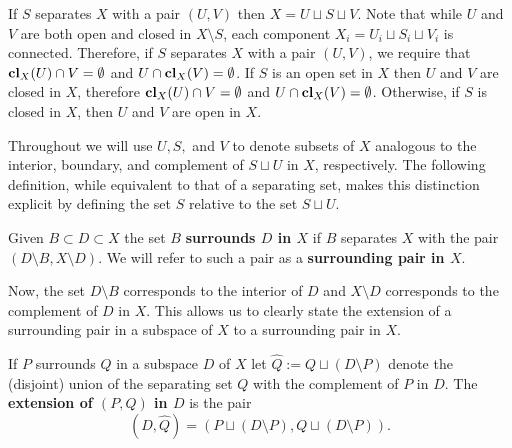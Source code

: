 If $S$ separates $X$ with a pair $(U, V)$ then $X = U\sqcup S\sqcup V$.
Note that while $U$ and $V$ are both open and closed in $X\setminus S$, each component $X_i = U_i\sqcup S_i\sqcup V_i$ is connected.
Therefore, if $S$ separates $X$ with a pair $(U, V)$, we require that $\mathbf{cl}_X(U)\cap V = \emptyset$ and $U\cap \mathbf{cl}_X(V) = \emptyset$.
If $S$ is an open set in $X$ then $U$ and $V$ are closed in $X$, therefore $\mathbf{cl}_X(U)\cap V = \emptyset$ and $U\cap \mathbf{cl}_X(V) = \emptyset$.
Otherwise, if $S$ is closed in $X$, then $U$ and $V$ are open in $X$.


Throughout we will use $U, S,$ and $V$ to denote subsets of $X$ analogous to the interior, boundary, and complement of $S\sqcup U$ in $X$, respectively.
The following definition, while equivalent to that of a separating set, makes this distinction explicit by defining the set $S$ relative to the set $S\sqcup U$.

\begin{definition}[Surrounding]
  Given $B\subset D \subset X$ the set $B$ \textbf{surrounds $D$ in $X$} if $B$ separates $X$ with the pair $(D\setminus B, X\setminus D)$.
  We will refer to such a pair as a \textbf{surrounding pair in $X$}.
\end{definition}

Now, the set $D\setminus B$ corresponds to the interior of $D$ and $X\setminus D$ corresponds to the complement of $D$ in $X$.
This allows us to clearly state the extension of a surrounding pair in a subspace of $X$ to a surrounding pair in $X$.

\begin{definition}[Extension]
  If $P$ surrounds $Q$ in a subspace $D$ of $X$ let $\hat{Q} := Q\sqcup (D\setminus P)$ denote the (disjoint) union of the separating set $Q$ with the complement of $P$ in $D$.
  The \textbf{extension of $(P, Q)$ in $D$} is the pair
  \[ (D, \hat{Q}) = (P\sqcup (D\setminus P), Q\sqcup (D\setminus P)).\]
\end{definition}

